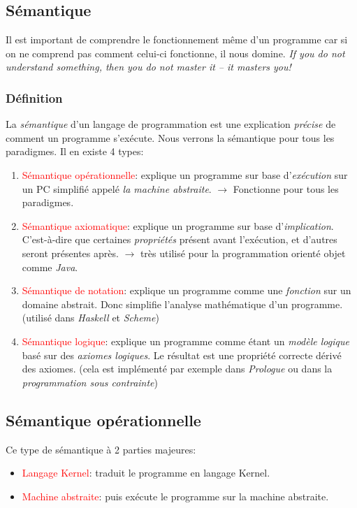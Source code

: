 \documentclass{report}
\begin{document}
\subsection{Sémantique}
Il est important de comprendre le fonctionnement même d'un programme car si on ne comprend pas comment celui-ci fonctionne, il nous domine. \textit{If you do not understand something, then you do not master it – it masters you!}
\subsubsection{Définition}
La \textit{sémantique} d'un langage de programmation est une explication \textit{précise} de comment un programme s'exécute. Nous verrons la sémantique pour tous les paradigmes. Il en existe 4 types:
\begin{enumerate}
\item \textcolor{red}{Sémantique opérationnelle}: explique un programme sur base d'\textit{exécution} sur un PC simplifié appelé \textit{la machine abstraite}. $\rightarrow$ Fonctionne pour tous les paradigmes.
\item \textcolor{red}{Sémantique axiomatique}: explique un programme sur base d'\textit{implication}. C'est-à-dire que certaines \textit{propriétés} présent avant l'exécution, et d'autres seront présentes après. $\rightarrow$ très utilisé pour la programmation orienté objet comme \textit{Java}.
\item \textcolor{red}{Sémantique de notation}: explique un programme comme une \textit{fonction} sur un domaine abstrait. Donc simplifie l'analyse mathématique d'un programme. (utilisé dans \textit{Haskell} et \textit{Scheme})
\item \textcolor{red}{Sémantique logique}: explique un programme comme étant un \textit{modèle logique} basé sur des \textit{axiomes logiques}. Le résultat est une propriété correcte dérivé des axiomes. (cela est implémenté par exemple dans \textit{Prologue} ou dans la \textit{programmation sous contrainte})
\end{enumerate}

\subsection{Sémantique opérationnelle}
Ce type de sémantique à 2 parties majeures:
\begin{itemize}
\item \textcolor{red}{Langage Kernel}: traduit le programme en langage Kernel.
\item \textcolor{red}{Machine abstraite}: puis exécute le programme sur la machine abstraite.
\end{itemize}
\end{document}

